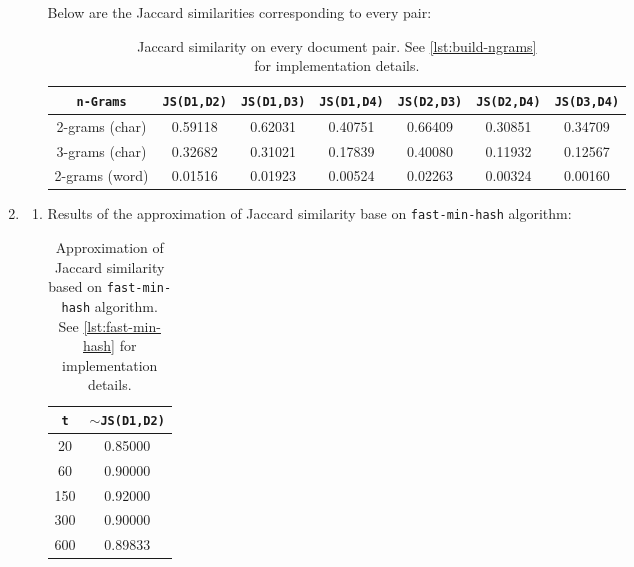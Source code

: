\documentclass{article}
\begin{document}
\begin{enumerate}[leftmargin={*}, font={\bf}, label={\arabic*.}, ref={\arabic*}]
\begin{enumerate}[label={(\Alph*)}, ref={\theenumi(\Alph*)}]
        \bigskip

        Below are the Jaccard similarities corresponding to every pair:
        \vspace{-5\parskip}

        \begin{minipage}{\linewidth}
          \begin{table}[H]
            \centering
            \begin{tabular}{|ccccccc|}
              \hline
              {\tt n-Grams} & {\tt JS(D1,D2)} & {\tt JS(D1,D3)} & {\tt JS(D1,D4)} & {\tt JS(D2,D3)} & {\tt JS(D2,D4)} & {\tt JS(D3,D4)} \\ \hline \hline
              2-grams (char) & 0.59118 & 0.62031 & 0.40751 & 0.66409 & 0.30851 & 0.34709 \\ \hline
              3-grams (char) & 0.32682 & 0.31021 & 0.17839 & 0.40080 & 0.11932 & 0.12567 \\ \hline
              2-grams (word) & 0.01516 & 0.01923 & 0.00524 & 0.02263 & 0.00324 & 0.00160 \\ \hline
            \end{tabular}
            \caption{
              Jaccard similarity on every document pair. See \autoref{lst:build-ngrams} \\
              for implementation details.
            }
          \end{table}
        \end{minipage}
    \end{enumerate}

  \item \label{qst:2}
    \begin{enumerate}[label={(\Alph*)}, ref={\theenumi(\Alph*)}]
      \item \label{qst:2A}
        Results of the approximation of Jaccard similarity base on {\tt fast-min-hash}
        algorithm:
        \begin{table}[H]
          \centering
          \begin{tabular}{|cc|}
            \hline
            {\tt t} & {\tt $\sim$JS(D1,D2)} \\ \hline \hline
            20 & 0.85000 \\ \hline
            60 & 0.90000 \\ \hline
            150 & 0.92000 \\ \hline
            300 & 0.90000 \\ \hline
            600 & 0.89833 \\ \hline
          \end{tabular}
          \caption{
            Approximation of Jaccard similarity based on {\tt fast-min-hash} algorithm. \\
            See \autoref{lst:fast-min-hash} for implementation details.
          }
        \end{table}


\end{enumerate}
\end{enumerate}
\end{document}
